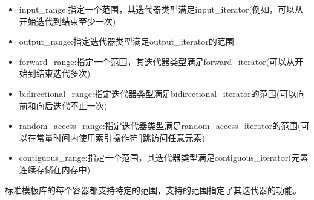 \begin{itemize}
\item
input\_range:指定一个范围，其迭代器类型满足input\_iterator(例如，可以从开始迭代到结束至少一次)

\item
output\_range:指定迭代器类型满足output\_iterator的范围

\item
forward\_range:指定一个范围，其迭代器类型满足forward\_iterator(可以从开始到结束迭代多次)

\item
bidirectional\_range:指定迭代器类型满足bidirectional\_iterator的范围(可以向前和向后迭代不止一次)

\item
random\_access\_range:指定迭代器类型满足random\_access\_iterator的范围(可以在常量时间内使用索引操作符[]跳访问任意元素)

\item
contiguous\_range:指定一个范围，其迭代器类型满足contiguous\_iterator(元素连续存储在内存中)
\end{itemize}

标准模板库的每个容器都支持特定的范围，支持的范围指定了其迭代器的功能。

